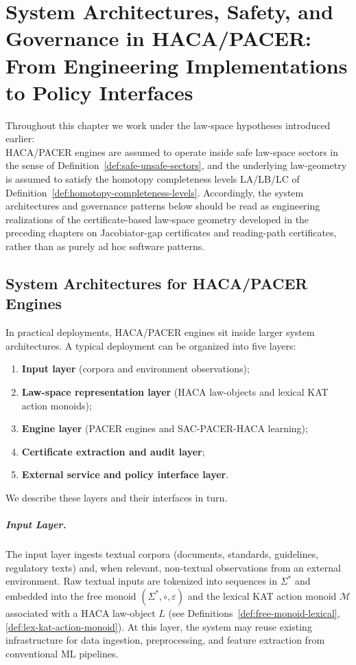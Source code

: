 \documentclass[11pt]{book}
\theoremstyle{plain}
\theoremstyle{definition}
\theoremstyle{remark}
\begin{document}
\chapter[System Architectures, Safety, and Governance in HACA/PACER]{System Architectures, Safety, and Governance in HACA/PACER:\\
         From Engineering Implementations to Policy Interfaces}


Throughout this chapter we work under the law-space hypotheses
introduced earlier: \\HACA/PACER engines are assumed to operate inside
safe law-space sectors in the sense of
Definition~\ref{def:safe-unsafe-sectors}, and the underlying
law-geometry is assumed to satisfy the homotopy completeness levels
LA/LB/LC of Definition~\ref{def:homotopy-completeness-levels}.
Accordingly, the system architectures and governance patterns below
should be read as engineering realizations of the certificate-based
law-space geometry developed in the preceding chapters on
Jacobiator-gap certificates and reading-path certificates, rather than
as purely ad hoc software patterns.

\section[System Architectures for HACA/PACER Engines]{System Architectures for HACA/PACER Engines}


In practical deployments, HACA/PACER engines sit inside larger system
architectures. A typical deployment can be organized into five layers:
\begin{enumerate}
  \item \textbf{Input layer} (corpora and environment observations);
  \item \textbf{Law-space representation layer} (HACA law-objects and
        lexical KAT action monoids);
  \item \textbf{Engine layer} (PACER engines and SAC-PACER-HACA
        learning);
  \item \textbf{Certificate extraction and audit layer};
  \item \textbf{External service and policy interface layer}.
\end{enumerate}
We describe these layers and their interfaces in turn.

\paragraph{Input Layer.}
The input layer ingests textual corpora (documents, standards,
guidelines, regulatory texts) and, when relevant, non-textual
observations from an external environment. Raw textual inputs are
tokenized into sequences in $\Sigma^*$ and embedded into the free
monoid $(\Sigma^*,\circ,\varepsilon)$ and the lexical KAT action
monoid $\mathcal{M}$ associated with a HACA law-object $L$ (see
Definitions~\ref{def:free-monoid-lexical},
\ref{def:lex-kat-action-monoid}). At this layer, the system may reuse
existing infrastructure for data ingestion, preprocessing, and
feature extraction from conventional ML pipelines.
\end{document}
